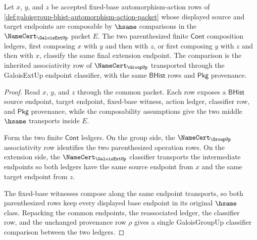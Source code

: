 \begin{theorem}
\label{thm:galoisgroup-composition-associativity-ledger}
Let $x$, $y$, and $z$ be accepted fixed-base automorphism-action rows of
\autoref{def:galoisgroup-bhist-automorphism-action-packet} whose displayed
source and target endpoints are composable by $\hsame$ comparisons in the
$\NameCert_{\GaloisExtUp}$ packet $E$. The two parenthesized finite
$\mathsf{Cont}$ composition ledgers, first composing $x$ with $y$ and then with
$z$, or first composing $y$ with $z$ and then with $x$, classify the same final
extension endpoint. The comparison is the inherited associativity row of
$\NameCert_{\GroupUp}$ transported through the GaloisExtUp endpoint classifier,
with the same $\mathsf{BHist}$ rows and $\mathsf{Pkg}$ provenance.
\end{theorem}
\begin{proof}
Read $x$, $y$, and $z$ through the common packet. Each row exposes a
$\mathsf{BHist}$ source endpoint, target endpoint, fixed-base witness, action
ledger, classifier row, and $\mathsf{Pkg}$ provenance, while the composability
assumptions give the two middle $\hsame$ transports inside $E$.

Form the two finite $\mathsf{Cont}$ ledgers. On the group side, the
$\NameCert_{\GroupUp}$ associativity row identifies the two parenthesized
operation rows. On the extension side, the $\NameCert_{\GaloisExtUp}$
classifier transports the intermediate endpoints so both ledgers have the same
source endpoint from $x$ and the same target endpoint from $z$.

The fixed-base witnesses compose along the same endpoint transports, so both
parenthesized rows keep every displayed base endpoint in its original
$\hsame$ class. Repacking the common endpoints, the reassociated ledger, the
classifier row, and the unchanged provenance row $\rho$ gives a single
GaloisGroupUp classifier comparison between the two ledgers.
\end{proof}

